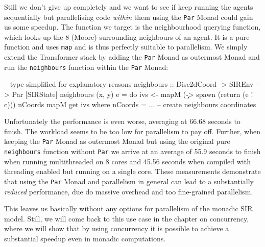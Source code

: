 Still we don't give up completely and we want to see if keep running the agents sequentially but parallelising code \textit{within} them using the \texttt{Par} Monad could gain us some speedup. The function we target is the neighbourhood querying function, which looks up the 8 (Moore) surrounding neighbours of an agent. It is a pure function and uses \texttt{map} and is thus perfectly suitable to parallelism. We simply extend the Transformer stack by adding the \texttt{Par} Monad as outermost Monad and run the \texttt{neighbours} function within the \texttt{Par} Monad:

\begin{HaskellCode}
-- type simplified for explanatory reasons
neighbours :: Disc2dCoord -> SIREnv -> Par [SIRState]
neighbours (x, y) e = do
    ivs <- mapM (\c -> spawn (return (e ! c))) nCoords
    mapM get ivs
  where
    nCoords = ... -- create neighbours coordinates
\end{HaskellCode}

Unfortunately the performance is even worse, averaging at 66.68 seconds to finish. The workload seems to be too low for parallelism to pay off. Further, when keeping the \texttt{Par} Monad as outermost Monad but using the original pure \texttt{neighbours} function without \texttt{Par} we arrive at an average of 55.9 seconds to finish when running multithreaded on 8 cores and 45.56 seconds when compiled with threading enabled but running on a single core. These measurements demonstrate that using the \texttt{Par} Monad and parallelism in general can lead to a substantially \textit{reduced} performance, due do massive overhead and too fine-grained parallelism.

This leaves us basically without any options for parallelism of the monadic SIR model. Still, we will come back to this use case in the chapter on concurrency, where we will show that by using concurrency it is possible to achieve a substantial speedup even in monadic computations.